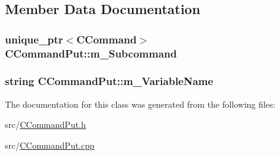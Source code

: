 \subsection{Member Data Documentation}
\subsubsection[{\texorpdfstring{m\+\_\+\+Subcommand}{m_Subcommand}}]{\setlength{\rightskip}{0pt plus 5cm}unique\+\_\+ptr$<${\bf C\+Command}$>$ C\+Command\+Put\+::m\+\_\+\+Subcommand\hspace{0.3cm}{\ttfamily [private]}}\hypertarget{classCCommandPut_abf1c7a0d0d5c112640b529ba90637d74}{}\label{classCCommandPut_abf1c7a0d0d5c112640b529ba90637d74}
\subsubsection[{\texorpdfstring{m\+\_\+\+Variable\+Name}{m_VariableName}}]{\setlength{\rightskip}{0pt plus 5cm}string C\+Command\+Put\+::m\+\_\+\+Variable\+Name\hspace{0.3cm}{\ttfamily [private]}}\hypertarget{classCCommandPut_a583f3fd126a5fc69456c4538e1783f00}{}\label{classCCommandPut_a583f3fd126a5fc69456c4538e1783f00}


The documentation for this class was generated from the following files\+:\begin{DoxyCompactItemize}
\item 
src/\hyperlink{CCommandPut_8h}{C\+Command\+Put.\+h}\item 
src/\hyperlink{CCommandPut_8cpp}{C\+Command\+Put.\+cpp}\end{DoxyCompactItemize}
